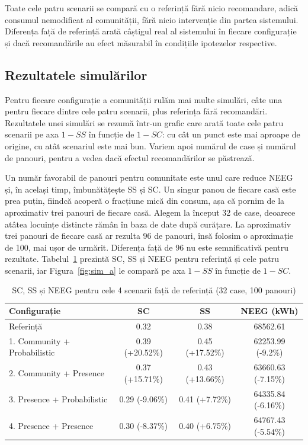\documentclass[12pt,a4paper]{report}
\begin{document}
Toate cele patru scenarii se compară cu o referință fără nicio recomandare, adică consumul nemodificat al comunității, fără nicio intervenție din partea sistemului. Diferența față de referință arată câștigul real al sistemului în fiecare configurație și dacă recomandările au efect măsurabil în condițiile ipotezelor respective.

\subsection*{Rezultatele simulărilor}

Pentru fiecare configurație a comunității rulăm mai multe simulări, câte una pentru fiecare dintre cele patru scenarii, plus referința fără recomandări. Rezultatele unei simulări se rezumă într-un grafic care arată toate cele patru scenarii pe axa $1-SS$ în funcție de $1-SC$: cu cât un punct este mai aproape de origine, cu atât scenariul este mai bun. Variem apoi numărul de case și numărul de panouri, pentru a vedea dacă efectul recomandărilor se păstrează.

Un număr favorabil de panouri pentru comunitate este unul care reduce NEEG și, în același timp, îmbunătățește SS și SC. Un singur panou de fiecare casă este prea puțin, fiindcă acoperă o fracțiune mică din consum, așa că pornim de la aproximativ trei panouri de fiecare casă. Alegem la început 32 de case, deoarece atâtea locuințe distincte rămân în baza de date după curățare. La aproximativ trei panouri de fiecare casă ar rezulta 96 de panouri, însă folosim o aproximație de 100, mai ușor de urmărit. Diferența față de 96 nu este semnificativă pentru rezultate. Tabelul~\ref{tab:sim_a} prezintă SC, SS și NEEG pentru referință și cele patru scenarii, iar Figura~\ref{fig:sim_a} le compară pe axa $1-SS$ în funcție de $1-SC$.

\begin{table}[h]
  \centering
  \begin{tabular}{|l|c|c|c|}
    \hline
    \textbf{Configurație}        & \textbf{SC}     & \textbf{SS}     & \textbf{NEEG (kWh)} \\
    \hline
    Referință                    & 0.32            & 0.38            & 68562.61            \\
    \hline
    1. Community + Probabilistic & 0.39 (+20.52\%) & 0.45 (+17.52\%) & 62253.99 (-9.2\%)   \\
    \hline
    2. Community + Presence      & 0.37 (+15.71\%) & 0.43 (+13.66\%) & 63660.63 (-7.15\%)  \\
    \hline
    3. Presence + Probabilistic  & 0.29 (-9.06\%)  & 0.41 (+7.72\%)  & 64335.84 (-6.16\%)  \\
    \hline
    4. Presence + Presence       & 0.30 (-8.37\%)  & 0.40 (+6.75\%)  & 64767.43 (-5.54\%)  \\
    \hline
  \end{tabular}
  \caption{SC, SS și NEEG pentru cele 4 scenarii față de referință (32 case, 100 panouri)}
  \label{tab:sim_a}
\end{table}
\end{document}
